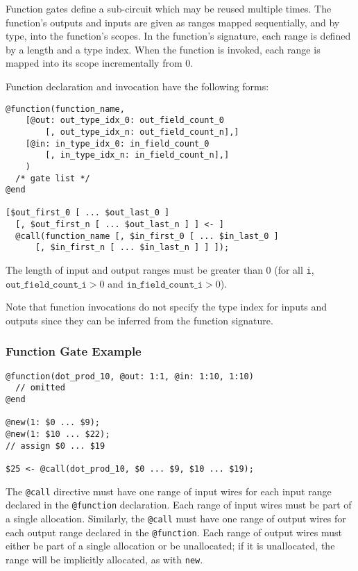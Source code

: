 Function gates define a sub-circuit which may be reused multiple times.
The function's outputs and inputs are given as ranges mapped sequentially, and by type, into the function's scopes.
In the function's signature, each range is defined by a length and a type index.
When the function is invoked, each range is mapped into its scope incrementally from 0.

Function declaration and invocation have the following forms:
%
\begin{lstlisting}[language=ir]
@function(function_name,
    [@out: out_type_idx_0: out_field_count_0
	    [, out_type_idx_n: out_field_count_n],]
    [@in: in_type_idx_0: in_field_count_0
	    [, in_type_idx_n: in_field_count_n],]
    )
  /* gate list */
@end

[$out_first_0 [ ... $out_last_0 ]
  [, $out_first_n [ ... $out_last_n ] ] <- ]
  @call(function_name [, $in_first_0 [ ... $in_last_0 ]
      [, $in_first_n [ ... $in_last_n ] ] ]);
\end{lstlisting}
The length of input and output ranges must be greater than 0 (for all \texttt{i}, $\texttt{out\_field\_count\_i} > 0$ and $\texttt{in\_field\_count\_i} > 0$).

Note that function invocations do not specify the type index for inputs and outputs since they can be inferred from the function signature.

\subsubsection{Function Gate Example}
\label{sec:funccall}
\begin{lstlisting}[language=ir]
@function(dot_prod_10, @out: 1:1, @in: 1:10, 1:10)
  // omitted
@end

@new(1: $0 ... $9);
@new(1: $10 ... $22);
// assign $0 ... $19

$25 <- @call(dot_prod_10, $0 ... $9, $10 ... $19);
\end{lstlisting}

The \texttt{@call} directive must have one range of input wires for each input
range declared in the \texttt{@function} declaration.
Each range of input wires must be part of a single allocation.
Similarly, the \texttt{@call} must have one range of output wires for each
output range declared in the \texttt{@function}.
Each range of output wires must either be part of a single allocation or be
unallocated; if it is unallocated, the range will be implicitly allocated, as
with \texttt{new}.

